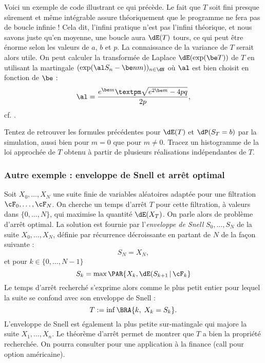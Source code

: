 {{%

Voici un exemple de code \ML{} illustrant ce qui précède. Le fait que
$T$ soit fini presque sûrement et même intégrable assure théoriquement
que le programme ne fera pas de boucle infinie !  Cela dit, l'infini
pratique n'est pas l'infini théorique, et nous savons juste qu'en
moyenne, une boucle aura $\dE(T)$ tours, ce qui peut être énorme selon
les valeurs de $a$, $b$ et $p$.  La connaissance de la variance de $T$
serait alors utile. On peut calculer la transformée de Laplace
$\dE(\exp(\be T))$ de $T$ en utilisant la martingale $(\exp(\al
S_n-\be n m))_{n\in\dN}$ où $\al$ est bien choisit en fonction de
$\be$ :
$$
\al=\frac{e^{\be m}±\sqrt{e^{2\be m}-4pq}}{2p},
$$
cf. \cite[exercice 8.8 page 247]{cottrell-duhamel}.

%
% 

Tentez de retrouver les formules précédentes pour $\dE(T)$ et
$\dP(S_T=b)$ par la simulation, aussi bien pour $m=0$ que pour $m\neq
0$. Tracez un histogramme de la loi approchée de $T$ obtenu à partir
de plusieurs réalisations indépendantes de $T$.

%
\subsubsection{Autre exemple : enveloppe de Snell et arrêt optimal}
%

Soit $X_0,\ldots,X_N$ une suite finie de variables aléatoires adaptée
pour une filtration $\cF_0,\ldots,\cF_N$. On cherche un temps d'arrêt
$T$ pour cette filtration, à valeurs dans $\{0,\ldots,N\}$, qui
maximise la quantité $\dE(X_T)$. On parle alors de problème d'arrêt
optimal. La solution est fournie par l'\emph{enveloppe de Snell}
$S_0,\ldots,S_N$ de la suite $X_0,\ldots,X_N$, définie par récurrence
décroissante en partant de $N$ de la façon suivante :
$$
S_N=X_N,
$$
et pour $k \in \{0,\ldots,N-1\}$
$$
S_k=\max\PAR{X_k,\dE(S_{k+1}\,\vert\,\cF_k}
$$
Le temps d'arrêt recherché s'exprime alors comme le plus petit entier
pour lequel la suite se confond avec son enveloppe de Snell :
$$
T:=\inf\BRA{k,\; X_k=S_k}.
$$
L'enveloppe de Snell est également la plus petite sur-matingale qui
majore la suite $X_1,\ldots,X_n$. Le théorème d'arrêt permet de
montrer que $T$ a bien la propriété recherchée.  On pourra consulter
\cite{lamberton-lapeyre} pour une application à la finance (call pour
option américaine).

}}
